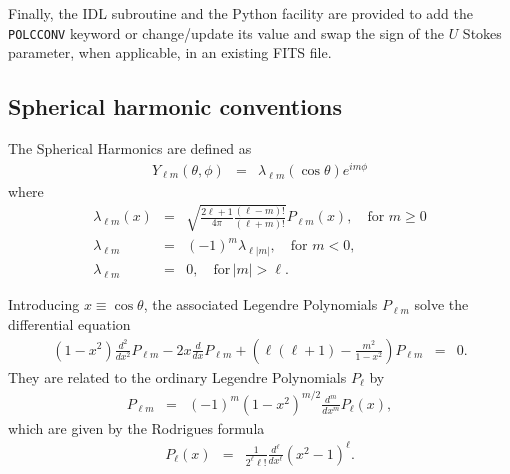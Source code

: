\documentclass[12pt,twoside]{article}
\newcommand{\myhtmlimage}[1]{ }
\begin{document}
Finally, 
the IDL subroutine 
and the Python facility 
 are 
provided to add the  \texttt{POLCCONV} keyword or
change/update its value and swap the sign of the $U$ Stokes parameter, when applicable, in
an existing FITS file.

%
\subsection{Spherical harmonic conventions}
\label{sphericalstuff}

The Spherical Harmonics are defined as
\begin{eqnarray}
	Y_{\ell m}(\theta,\phi) &=& \lambda_{\ell m}(\cos\theta) e^{{i}
	m\phi} \label{eq:ylm_def} \myhtmlimage{}
\end{eqnarray}
where 
\begin{eqnarray}
	\lambda_{\ell m}(x) &=& \sqrt{ \frac{2\ell+1}{4\pi}
	\frac{(\ell-m)!}{(\ell+m)!} } P_{\ell m}(x), \quad\textrm{for~}
	m\ge 0 	\label{eq:lam_def} \\
%
	\lambda_{\ell m} &=& (-1)^m \lambda_{\ell |m|}, \quad\textrm{for~}
	m <  0, \nonumber \\
%
	\lambda_{\ell m} &=& 0, \quad\textrm{for}\, |m| > \ell.\nonumber
	\myhtmlimage{}
\end{eqnarray}

Introducing $x\equiv\cos\theta$, the associated Legendre Polynomials $P_{\ell m}$ 
solve the differential equation
\begin{eqnarray}
	(1-x^2)\frac{d^2}{dx^2}P_{\ell m} - 2x \frac{d}{dx}P_{\ell m}
	+ \left(\ell(\ell+1) - \frac{m^2}{1-x^2}\right) P_{\ell m} &=& 0.
	\myhtmlimage{}
\label{eq:diff_eq}
\end{eqnarray}
They are related to the ordinary Legendre Polynomials $P_\ell$ by
\begin{eqnarray}
	P_{\ell m} &=& (-1)^m (1-x^2)^{m/2} \frac{d^m}{dx^m} P_{\ell}(x),
	\myhtmlimage{}
\label{eq:legendreass}
\end{eqnarray}
which are given by the Rodrigues formula
\begin{eqnarray}
	P_{\ell}(x) &=& \frac{1}{2^\ell \ell!}\frac{d^\ell}{dx^\ell} (x^2-1)^\ell.
	\myhtmlimage{}
\label{eq:rodrigues}
\end{eqnarray}
\end{document}
